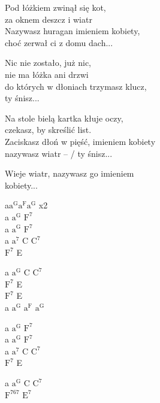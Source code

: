 \begin{text}
    \hfill\break
    Pod łóżkiem zwinął się kot,\\
    za oknem deszcz i wiatr\\
    Nazywasz huragan imieniem kobiety,\\
    choć zerwał ci z domu dach...

    Nic nie zostało, już nic,\\
    nie ma łóżka ani drzwi\\
    do których w dłoniach trzymasz klucz,\\
    ty śnisz...

    Na stole bielą kartka kłuje oczy,\\
    czekasz, by skreślić list.\\
    Zaciskasz dłoń w pięść, imieniem kobiety\\
    nazywasz wiatr – / ty śnisz...

    Wieje wiatr, nazywasz go imieniem\\
    kobiety...
\end{text}
\begin{chord}
    a$\mathrm{a^{G}}$$\mathrm{a^{F}}$$\mathrm{a^{G}}$ x2\\
    a $\mathrm{a^G}$ $\mathrm{F^7}$\\
    a $\mathrm{a^G}$ $\mathrm{F^7}$\\
    a $\mathrm{a^7}$ C $\mathrm{C^7}$\\
    $\mathrm{F^7}$ E

    a $\mathrm{a^G}$ C $\mathrm{C^7}$\\
    $\mathrm{F^7}$ E\\
    $\mathrm{F^7}$ E\\
    a $\mathrm{a^G}$ $\mathrm{a^F}$ $\mathrm{a^G}$

    a $\mathrm{a^G}$ $\mathrm{F^7}$\\
    a $\mathrm{a^G}$ $\mathrm{F^7}$\\
    a $\mathrm{a^7}$ C $\mathrm{C^7}$\\
    $\mathrm{F^7}$ E

    a $\mathrm{a^G}$ C $\mathrm{C^7}$\\
    $\mathrm{F^{7 6 7}}$ $\mathrm{E^7}$
\end{chord}
